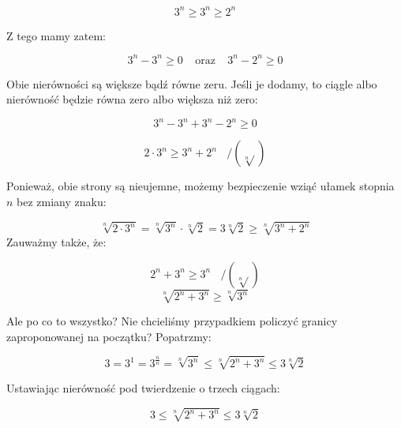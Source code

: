 \documentclass[a4paper,oneside,openright,11pt]{article}
\numberwithin{equation}{section}
\begin{document}
\begin{equation*}
    3^n \geq 3^n \geq 2^n
\end{equation*}

Z tego mamy zatem:

\begin{equation*}
    3^n - 3^n \geq 0 \ \ \ \ \  \mbox{oraz} \ \ \ \ \ 3^n - 2^n \geq 0
\end{equation*}

Obie nierówności są większe bądź równe zeru. Jeśli je dodamy, to ciągle albo nierówność będzie równa zero albo większa niż zero:

\begin{equation*}
    3^n - 3^n + 3^n - 2^n \geq 0
\end{equation*}

\begin{equation*}
    2 \cdot 3^n \geq 3^n + 2^n \ \ \ \ / (\sqrt[n]{})
\end{equation*}

Ponieważ, obie strony są nieujemne, możemy bezpieczenie wziąć ułamek stopnia $n$ bez zmiany znaku:

\begin{equation*}
    \sqrt[n]{2 \cdot 3^n} = \sqrt[n]{3^n} \cdot \sqrt[n]{2} = 3 \sqrt[n]{2} \geq \sqrt[n]{3^n + 2^n}
\end{equation*}
\noindent
Zauważmy także, że:

\begin{equation*}
    2^n + 3^n \geq 3^n \ \ \ \ / (\sqrt[n]{})
\end{equation*}
\begin{equation*}
    \sqrt[n]{2^n + 3^n} \geq \sqrt[n]{3^n}
\end{equation*}

\vspace{10mm}

Ale po co to wszystko? Nie chcieliśmy przypadkiem policzyć granicy zaproponowanej na początku? Popatrzmy:

\begin{equation*}
    3 = 3^1 = 3^{\frac{n}{n}} = \sqrt[n]{3^n} \leq \sqrt[n]{2^n + 3^n} \leq 3 \sqrt[n]{2}
\end{equation*}

Ustawiając nierówność pod twierdzenie o trzech ciągach:

\begin{equation*}
    3 \leq \sqrt[n]{2^n + 3^n} \leq 3 \sqrt[n]{2}
\end{equation*}
\end{document}
